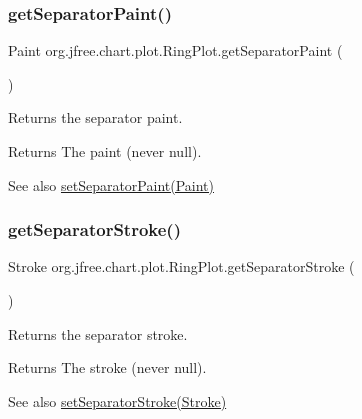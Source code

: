 \subsubsection{\texorpdfstring{get\+Separator\+Paint()}{getSeparatorPaint()}}
{\footnotesize\ttfamily Paint org.\+jfree.\+chart.\+plot.\+Ring\+Plot.\+get\+Separator\+Paint (\begin{DoxyParamCaption}{ }\end{DoxyParamCaption})}

Returns the separator paint.

\begin{DoxyReturn}{Returns}
The paint (never {\ttfamily null}).
\end{DoxyReturn}
\begin{DoxySeeAlso}{See also}
\mbox{\hyperlink{classorg_1_1jfree_1_1chart_1_1plot_1_1_ring_plot_ab84ed901a672a1986208fac5eea4d124}{set\+Separator\+Paint(\+Paint)}} 
\end{DoxySeeAlso}
\mbox{\label{classorg_1_1jfree_1_1chart_1_1plot_1_1_ring_plot_a1282d5d06eadea106d5ce3b25cc5010e}} 
\subsubsection{\texorpdfstring{get\+Separator\+Stroke()}{getSeparatorStroke()}}
{\footnotesize\ttfamily Stroke org.\+jfree.\+chart.\+plot.\+Ring\+Plot.\+get\+Separator\+Stroke (\begin{DoxyParamCaption}{ }\end{DoxyParamCaption})}

Returns the separator stroke.

\begin{DoxyReturn}{Returns}
The stroke (never {\ttfamily null}).
\end{DoxyReturn}
\begin{DoxySeeAlso}{See also}
\mbox{\hyperlink{classorg_1_1jfree_1_1chart_1_1plot_1_1_ring_plot_a2a7c5abc0cbdd3919ed689af86617749}{set\+Separator\+Stroke(\+Stroke)}} 
\end{DoxySeeAlso}
\mbox{\label{classorg_1_1jfree_1_1chart_1_1plot_1_1_ring_plot_a759cfedb67a89fb268c0c1b77f6952d1}} 
